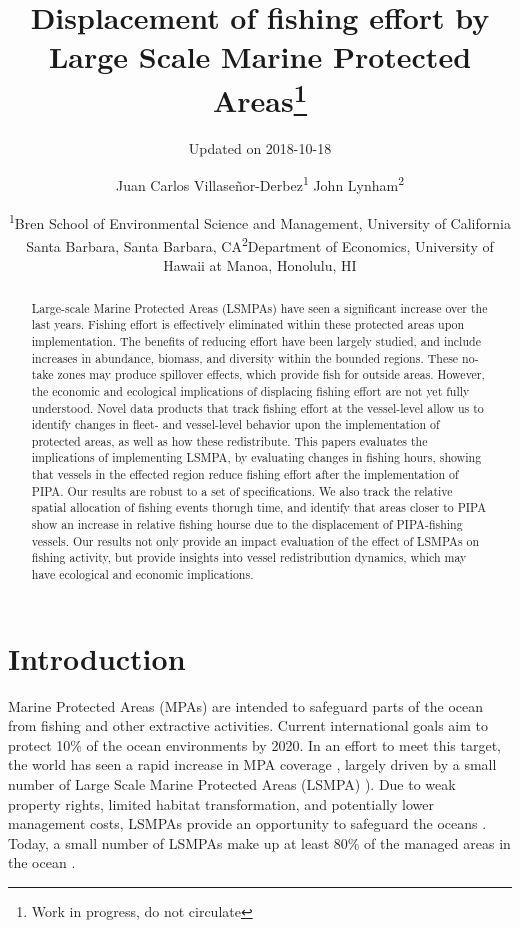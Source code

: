 \documentclass[11pt,]{article}
\title{Displacement of fishing effort by Large Scale Marine Protected
Areas\footnote{Work in progress, do not circulate}}
\subtitle{Updated on 2018-10-18}
\author{Juan Carlos Villaseñor-Derbez\textsuperscript{1} John
Lynham\textsuperscript{2}}
\date{\textsuperscript{1}Bren School of Environmental Science and Management,
University of California Santa Barbara, Santa Barbara,
CA\newline \textsuperscript{2}Department of Economics, University of
Hawaii at Manoa, Honolulu, HI}
\begin{document}
\maketitle
\begin{abstract}
Large-scale Marine Protected Areas (LSMPAs) have seen a significant
increase over the last years. Fishing effort is effectively eliminated
within these protected areas upon implementation. The benefits of
reducing effort have been largely studied, and include increases in
abundance, biomass, and diversity within the bounded regions. These
no-take zones may produce spillover effects, which provide fish for
outside areas. However, the economic and ecological implications of
displacing fishing effort are not yet fully understood. Novel data
products that track fishing effort at the vessel-level allow us to
identify changes in fleet- and vessel-level behavior upon the
implementation of protected areas, as well as how these redistribute.
This papers evaluates the implications of implementing LSMPA, by
evaluating changes in fishing hours, showing that vessels in the
effected region reduce fishing effort after the implementation of PIPA.
Our results are robust to a set of specifications. We also track the
relative spatial allocation of fishing events thorugh time, and identify
that areas closer to PIPA show an increase in relative fishing hourse
due to the displacement of PIPA-fishing vessels. Our results not only
provide an impact evaluation of the effect of LSMPAs on fishing
activity, but provide insights into vessel redistribution dynamics,
which may have ecological and economic implications.
\end{abstract}

\clearpage

\hypertarget{introduction}{%
\section{Introduction}\label{introduction}}

Marine Protected Areas (MPAs) are intended to safeguard parts of the
ocean from fishing and other extractive activities. Current
international goals aim to protect 10\% of the ocean environments by
2020. In an effort to meet this target, the world has seen a rapid
increase in MPA coverage \citep{wood_2008,sala_2018}, largely driven by
a small number of Large Scale Marine Protected Areas (LSMPA)
\citet{singleton_2014,boonzaier_2016,alger_2017}). Due to weak property
rights, limited habitat transformation, and potentially lower management
costs, LSMPAs provide an opportunity to safeguard the oceans
\citet{game_2009}. Today, a small number of LSMPAs make up at least 80\%
of the managed areas in the ocean \citet{toonen_2013}.
\end{document}
